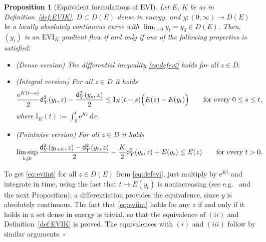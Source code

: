 \documentclass[reqno,11pt]{article}
\numberwithin{equation}{section}
\newcommand{\sfd}{{\sf d}}
\newcommand{\rme}{{\mathrm e}}
\renewcommand{\d}{{\mathrm d}}
\newcommand{\forevery}{\text{for every }}
\newcommand{\EVI}[4]{\mathrm{EVI}_{#4}(#1,{#2}_W,#3)}
\newenvironment{proof}{\removelastskip\par\medskip   %
\noindent{\em Proof.}
\rm}{\penalty-20\null\hfill$\square$\par\medbreak}
\newtheorem{proposition}[theorem]{Proposition}
\renewcommand{\EVI}{\ensuremath{\mathrm{EVI}}}
\begin{document}
\begin{proposition}[Equivalent formulations of $\EVI$]\label{prop:eviequiv}
Let $E$, $K$ be as in Definition~\ref{def:EVIK}, $D\subset D(E)$
dense in energy, and $y:(0,\infty)\to D(E)$ be a locally absolutely
continuous curve with $\lim_{t\downarrow0}y_t=y_0\in
\overline{D(E)}$. Then, $(y_t)$ is an $\EVI_K$ gradient flow if and
only if one of the following properties is satisfied:
\begin{itemize}
\item[(i)] (Dense version)
The differential inequality \eqref{eq:defevi} holds for all $z\in
D$.
\item[(ii)] (Integral version)
For all $z\in D$ it holds
\begin{equation}
\label{eq:eviint} \frac{\rme^{K(t-s)}}2
\sfd^2_Y(y_t,z)-\frac{\sfd^2_Y(y_s,z)}{2}\le \mathrm
I_K(t-s)\Big(E(z)-E(y_t)\Big)\qquad \forevery 0\le s\leq t,
\end{equation}
where $\mathrm I_K(t):=\int_0^t \rme^{K r}\,\d r$.
\item[(iii)] (Pointwise version) For all $z\in D$ it holds
\begin{equation}
\label{eq:evipoint} \limsup_{h\downarrow
0}\frac{\sfd^2_Y(y_{t+h},z)-\sfd^2_Y(y_t,z)}2+\frac
K2\sfd^2_Y(y_t,z)+E(y_t)\leq E(z)\qquad\forevery t>0.
\end{equation}
\end{itemize}
\end{proposition}
\begin{proof}
To get \eqref{eq:eviint} for all $z\in D(E)$ from \eqref{eq:defevi},
just multiply by $\rme^{Kt}$ and integrate in time, using the fact
that $t\mapsto E(y_t)$ is nonincreasing (see e.g.\
\cite{Clement-Desch10} and the next Proposition); a differentiation
provides the equivalence, since $y$ is absolutely continuous. The
fact that \eqref{eq:eviint} holds for any $z$ if and only if it
holds in a set dense in energy is trivial, so that the equivalence
of $(ii)$ and Definition~\ref{def:EVIK} is proved. The equivalences
with $(i)$ and $(iii)$ follow by similar arguments.
\end{proof}
\end{document}
